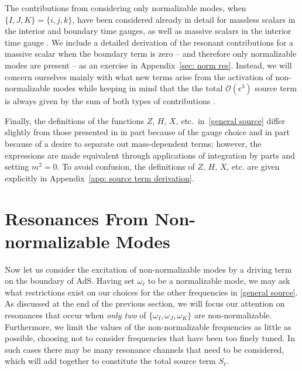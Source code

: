 \documentclass[letterpaper,11pt]{article}
\newcommand{\ol}{\omega_\ell}
\newcommand{\mc}{\mathcal}
\begin{document}
The contributions from considering only normalizable modes, when $\{ I, J, K \} = \{i, j ,k\}$, have been considered already in detail for massless scalars in the interior \cite{1407.6273} and boundary \cite{1412.3249} time gauges, as well as massive scalars in the interior time gauge \cite{1810.04753}. We include a detailed derivation of the resonant contributions for a massive scalar when the boundary term is zero -- and therefore only normalizable modes are present -- as an exercise in Appendix~\ref{sec: norm res}. Instead, we will concern ourselves mainly with what new terms arise from the activation of non-normalizable modes while keeping in mind that the the total $\mc O(\epsilon^3)$ source term is always given by the sum of both types of contributions \cite{1810.04753}.

Finally, the definitions of the functions $Z$, $H$, $X$, etc.~in~\eqref{general source} differ slightly from those presented in \cite{1407.6273, 1412.3249} in part because of the gauge choice and in part because of a desire to separate out mass-dependent terms; however, the expressions are made equivalent through applications of integration by parts and setting $m^2 = 0$. To avoid confusion, 
the definitions of $Z$, $H$, $X$, etc. are given explicitly in 
Appendix~\ref{app: source term derivation}.




\section{Resonances From Non-normalizable Modes}
\label{sec: NNmodes}

Now let us consider the excitation of non-normalizable modes by a driving term on the boundary of AdS. Having set $\ol$ to be a normalizable mode, we may ask what restrictions exist on our choices for the other frequencies in \eqref{general source}. As discussed at the end of the previous section, we will focus our attention on resonances that occur when \emph{only two} of $\{ \omega_I, \omega_J, \omega_K \}$ are non-normalizable. Furthermore, we limit the values of the non-normalizable frequencies as little as possible, choosing not to consider frequencies that have been too finely tuned. In such cases there may be many resonance channels that need to be considered, which will add together to constitute the total source term $S_\ell$.
\end{document}
